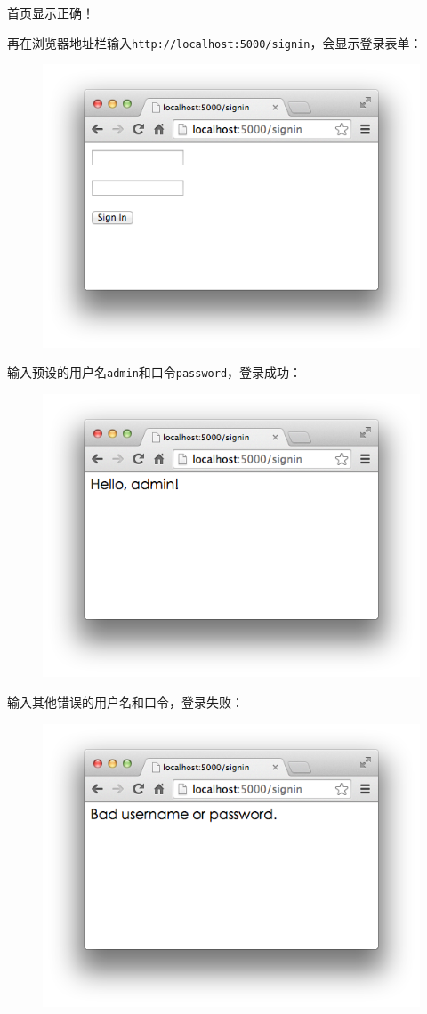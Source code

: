 首页显示正确！

再在浏览器地址栏输入\texttt{http://localhost:5000/signin}，会显示登录表单：

 
 \begin{figure}[htp]
	\centering
	\includegraphics[width=0.6\linewidth]{fig/951373657012736.png}
\end{figure}


输入预设的用户名\texttt{admin}和口令\texttt{password}，登录成功：

 
 \begin{figure}[htp]
	\centering
	\includegraphics[width=0.6\linewidth]{fig/951373763967808.png}
\end{figure}


输入其他错误的用户名和口令，登录失败：

 
 \begin{figure}[htp]
	\centering
	\includegraphics[width=0.6\linewidth]{fig/951373786253056.png}
\end{figure}


